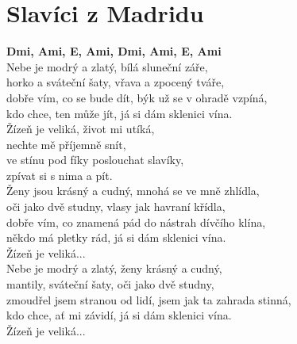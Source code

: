 \section{Slavíci z Madridu}
\onehalfspacing

\textbf{Dmi, Ami, E, Ami, Dmi, Ami, E, Ami}\\

Nebe je modrý a zlatý, bílá sluneční záře,\\
horko a sváteční šaty, vřava a zpocený tváře,\\
dobře vím, co se bude dít, býk už se v ohradě vzpíná,\\
kdo chce, ten může jít, já si dám sklenici vína.\\

{}Žízeň je veliká, život mi utíká,\\
nechte mě příjemně snít,\\
ve stínu pod fíky poslouchat slavíky,\\
zpívat si s nima a pít.\\

Ženy jsou krásný a cudný, mnohá se ve mně zhlídla,\\
oči jako dvě studny, vlasy jak havraní křídla,\\
dobře vím, co znamená pád do nástrah dívčího klína,\\
někdo má pletky rád, já si dám sklenici vína.\\

{}Žízeň je veliká...\\

Nebe je modrý a zlatý, ženy krásný a cudný,\\
mantily, sváteční šaty, oči jako dvě studny,\\
zmoudřel jsem stranou od lidí, jsem jak ta zahrada stinná,\\
kdo chce, ať mi závidí, já si dám sklenici vína.\\

{}Žízeň je veliká...\\